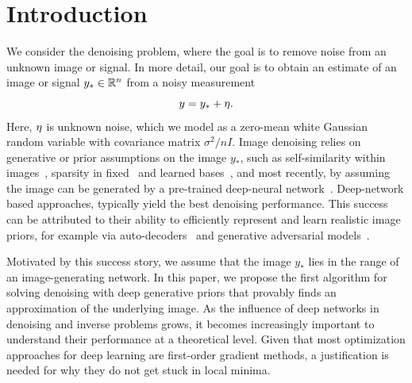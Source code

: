 
\section{Introduction} \label{sec:introduction}
We consider the denoising problem, where the goal is to remove noise from an unknown image or signal.
In more detail, our goal is to obtain an estimate of an image or signal $y_\ast \in \mathbb{R}^n$ from a noisy measurement
\[
y = y_\ast + \eta.
\]
Here, $\eta$ is unknown noise, which we model as a zero-mean white Gaussian random variable with covariance matrix $\sigma^2/n I$.
Image denoising relies on generative or prior assumptions on the image $y_\ast$, 
such as self-similarity within images~\citep{dabov_image_2007},
 sparsity in fixed~\citep{donoho_de-noising_1995} and learned bases~\citep{elad_image_2006}, and most recently, by assuming the image can be generated by a pre-trained deep-neural network~\citep{burger_image_2012,zhang_beyond_2017}.
Deep-network based approaches, typically yield the best denoising performance. This success can be attributed to their ability to efficiently represent and learn realistic image priors, for example via auto-decoders~\citep{hinton_reducing_2006} and generative adversarial models~\citep{goodfellow_generative_2014}.


Motivated by this success story, we assume that the image $y_\ast$ lies in the range of an image-generating network. 
In this paper, we propose the first algorithm for solving denoising with deep generative priors that provably finds an approximation of the underlying image. 
As the influence of deep networks in denoising and inverse problems grows, it becomes increasingly important to understand their performance at a theoretical level.  Given that most optimization approaches for deep learning are first-order gradient methods, a justification is needed for why they do not get stuck in local minima.  

